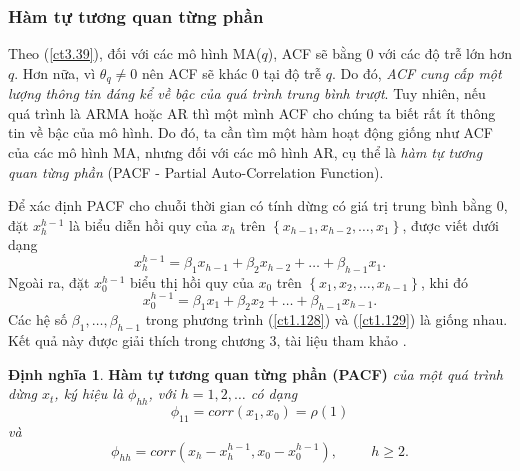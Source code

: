 \documentclass[12pt, a4paper,oneside]{book}
\theoremstyle{definition}
\newtheorem{dn}[theo]{Định nghĩa}
\begin{document}
\subsubsection*{Hàm tự tương quan từng phần}
Theo (\ref{ct3.39}), đối với các mô hình MA($q$), ACF sẽ bằng $0$ với các độ trễ lớn hơn $q$. Hơn nữa, vì $\theta_q\neq0$ nên ACF sẽ khác $0$ tại độ trễ $q$. Do đó, \textit{ACF cung cấp một lượng thông tin đáng kể về bậc của quá trình trung bình trượt}. Tuy nhiên, nếu quá trình là ARMA hoặc AR thì một mình ACF cho chúng ta biết rất ít thông tin về bậc của mô hình. Do đó, ta cần tìm một hàm hoạt động giống như ACF của các mô hình MA, nhưng đối với các mô hình AR, cụ thể là \textit{hàm tự tương quan từng phần} (PACF - Partial Auto-Correlation Function).

Để xác định PACF cho chuỗi thời gian có tính dừng có giá trị trung bình bằng $0$, đặt $x_h^{h-1}$ là biểu diễn hồi quy của $x_{h}$ trên $\left\lbrace x_{h-1}, x_{h-2}, \dots, x_{1}\right\rbrace$, được viết dưới dạng
\begin{equation}
x_h^{h-1}= \beta_{1}x_{h-1}+ \beta_{2}x_{h-2}+ \dots+ \beta_{h-1}x_{1}. \label{ct1.128}
\end{equation}
Ngoài ra, đặt $x_0^{h-1}$ biểu thị hồi quy của $x_{0}$ trên $\left\lbrace x_{1}, x_{2}, \dots, x_{h-1}\right\rbrace$, khi đó 
\begin{equation}
x_0^{h-1} = \beta_{1}x_{1}+\beta_{2}x_{2}+ \dots+ \beta_{h-1}x_{h-1}. \label{ct1.129}
\end{equation}
Các hệ số $\beta_{1}, \dots, \beta_{h-1}$ trong phương trình (\ref{ct1.128}) và (\ref{ct1.129}) là giống nhau. Kết quả này được giải thích trong chương 3, tài liệu tham khảo \cite{1}.

\begin{dn}\cite{1} \textbf{Hàm tự tương quan từng phần (PACF)}\textit{ của một quá trình dừng $x_{t}$, ký hiệu là $\phi_{hh}$, với $h=1, 2, \dots$ có dạng
		\begin{equation}
		\phi_{11}=corr(x_{1}, x_{0})=\rho(1) \label{ct1.130}
		\end{equation}	
		và 
		\begin{equation}
		\phi_{hh} = corr(x_{h}-x_h^{h-1}, x_{0}-x_0^{h-1}), \hspace{1cm} h \geq 2. \label{ct1.131}	
		\end{equation}}
\end{dn}
\end{document}
